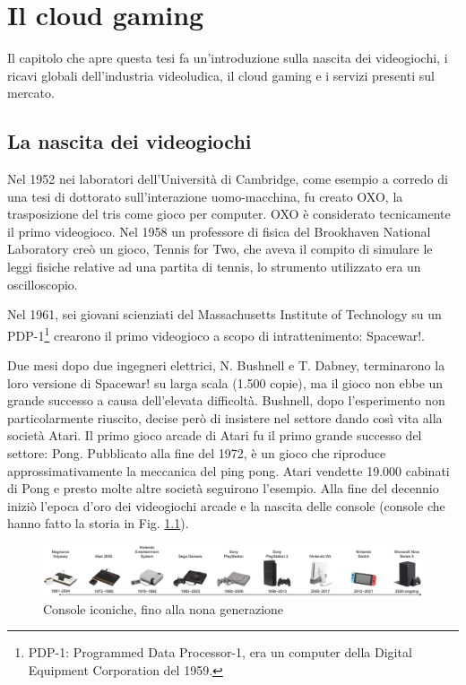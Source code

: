 %
%

\chapter{Il cloud gaming}
Il capitolo che apre questa tesi fa un'introduzione sulla nascita dei videogiochi, i ricavi globali dell'industria videoludica, il cloud gaming e i servizi presenti sul mercato.




\section{La nascita dei videogiochi}
Nel 1952 nei laboratori dell'Università di Cambridge, come esempio a corredo di una tesi di dottorato sull'interazione uomo-macchina, fu creato OXO, la trasposizione del tris come gioco per computer. OXO è considerato tecnicamente il primo videogioco. Nel 1958 un professore di fisica del Brookhaven National Laboratory creò un gioco, Tennis for Two, che aveva il compito di simulare le leggi fisiche relative ad una partita di tennis, lo strumento utilizzato era un oscilloscopio.

Nel 1961, sei giovani scienziati del Massachusetts Institute of Technology su un PDP-1\footnote{PDP-1: Programmed Data Processor-1, era un computer della Digital Equipment Corporation del 1959.} crearono il primo videogioco a scopo di intrattenimento: Spacewar!.

Due mesi dopo due ingegneri elettrici, N. Bushnell e T. Dabney, terminarono la loro versione di Spacewar! su larga scala (1.500 copie), ma il gioco non ebbe un grande successo a causa dell'elevata difficoltà. Bushnell, dopo l'esperimento non particolarmente riuscito, decise però di insistere nel settore dando così vita alla società Atari. Il primo gioco arcade di Atari fu il primo grande successo del settore: Pong. Pubblicato alla fine del 1972, è un gioco che riproduce approssimativamente la meccanica del ping pong. Atari vendette 19.000 cabinati di Pong e presto molte altre società seguirono l'esempio. Alla fine del decennio iniziò l'epoca d'oro dei videogiochi arcade e la nascita delle console (console che hanno fatto la storia in Fig. \ref{fig:consoles_history}).

\begin{figure}[H]
	\includegraphics[width=\linewidth]{immagini/consoles_history}
	\caption{Console iconiche, fino alla nona generazione}
	\label{fig:consoles_history}
\end{figure}

